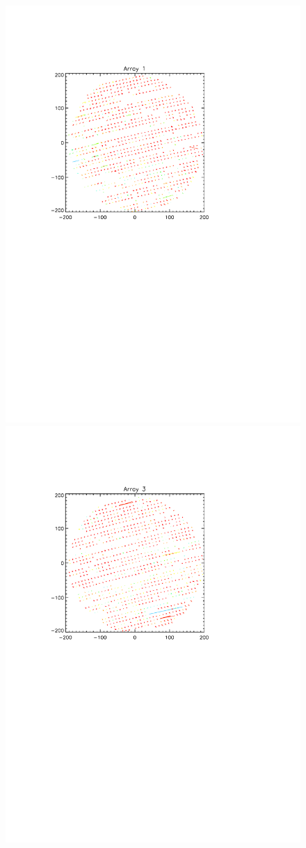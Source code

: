 \begin{figure}
\begin{center}
\includegraphics[trim=2cm 14cm 5cm 4cm, clip=true,width=0.6\linewidth]{Figures/A1_positions.pdf}
\includegraphics[trim=2cm 14cm 5cm 4cm, clip=true,width=0.6\linewidth]{Figures/A3_positions.pdf}

\end{center}
\end{figure}
